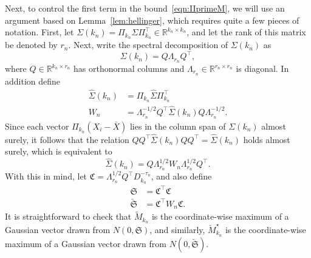 \documentclass[aos,preprint]{imsart}
\numberwithin{equation}{section}
\theoremstyle{plain}
\newcommand{\R}{\mathbb{R}}
\renewcommand{\hat}[1]{\widehat{#1}}
\newcommand{\ttop}{^{\top}}
\newcommand{\1}{{\bf{1}}}
\newcommand{\0}{\mathbf{0}}
\begin{document}
Next, to control the first term in the bound~\eqref{eqn:IIprimeM}, we will use an argument based on  Lemma~\ref{lem:hellinger}, which requires quite a few pieces of notation. First, let
$\Sigma(k_n)=\Pi_{k_n}\Sigma\Pi_{k_n}\ttop \in\R^{k_n\times k_n}$, and let the rank of this matrix be denoted by $r_n$. Next, write the spectral decomposition of $\Sigma(k_n)$ as
 $$\Sigma(k_n)=Q\Lambda_{r_n}Q\ttop,$$
 where $Q\in\R^{k_n\times r_n}$ has orthonormal columns and $\Lambda_{r_n}\in\R^{r_n\times r_n}$ is diagonal. In addition define 
\begin{equation}\label{eqn:whitemultdef}
\begin{split}
\hat\Sigma(k_n)&=\Pi_{k_n}\hat\Sigma \Pi_{k_n}\ttop\\[0.2cm]
W_n&= \Lambda_{r_n}^{-1/2}Q\ttop \hat\Sigma(k_n) Q\Lambda_{r_n}^{-1/2}.
\end{split}
\end{equation}
Since each vector $\Pi_{k_n}(X_i-\bar X)$ lies in the column span of $\Sigma(k_n)$ almost surely, it follows that the relation $QQ\ttop\hat\Sigma(k_n)QQ\ttop=\hat\Sigma(k_n)$ holds almost surely, which is equivalent to
$$\hat\Sigma(k_n)=Q\Lambda_{r_n}^{1/2}W_n\Lambda_{r_n}^{1/2}Q\ttop.$$
With this in mind,  let $\mathfrak{C}=\Lambda_{r_n}^{1/2}Q\ttop D_{k_n}^{-\tau_n}$, and also define
\begin{equation}
\begin{split}
\mathfrak{S}&=\mathfrak{C}\ttop \mathfrak{C}\\[0.2cm]
\breve{\mathfrak{S}} &= \mathfrak{C}\ttop W_n\mathfrak{C}.
\end{split}
\end{equation}
It is straightforward to check that $\tilde M_{k_n}$ is the coordinate-wise maximum of a Gaussian vector drawn from $N(0,\mathfrak{S})$, and similarly, $\breve M_{k_n}^{\star}$ is the coordinate-wise maximum of a Gaussian vector drawn from $N(0,\breve{\mathfrak{S}})$.
\end{document}
